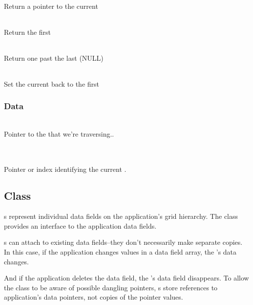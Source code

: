 \documentclass[11pt]{article}
\begin{document}
     \\
    Return a pointer to the current 

     \\
    Return the first 

     \\
    Return one past the last  (NULL)

     \\
    Set the current  back to the first 


\subsubsection{ Data}

     \\
    Pointer to the  that we're traversing..

     \\
     \\
    Pointer or index identifying the current .


\subsection{ Class} \label{s:vector}

   s represent individual data fields on the
   application's grid hierarchy.  The  class provides an
   interface to the application data fields.

   s can attach to existing data fields--they don't
   necessarily make separate copies.  In this case, if the application
   changes values in a data field array, the 's data
   changes.  

   And if the application deletes the data field, the 's
   data field disappears.  To allow the  class to be
   aware of possible dangling pointers, s store
   references to application's data pointers, not copies of the
   pointer values.
\end{document}
